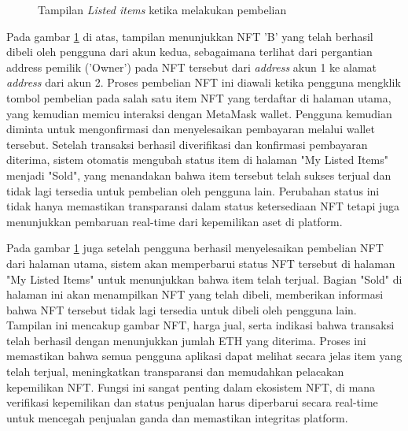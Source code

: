       \begin{figure} [H] \centering
        \caption{Tampilan \emph{Listed items} ketika melakukan pembelian}
        \label{fig:new_listed_item}
        \end{figure}

     Pada gambar \ref{fig:new_listed_item} di atas, tampilan menunjukkan NFT 'B' yang telah berhasil dibeli oleh pengguna dari akun kedua, sebagaimana terlihat dari pergantian address pemilik ('Owner') pada NFT tersebut dari \emph{address} akun 1 ke alamat \emph{address} dari akun 2. Proses pembelian NFT ini diawali ketika pengguna mengklik tombol pembelian pada salah satu item NFT yang terdaftar di halaman utama, yang kemudian memicu interaksi dengan MetaMask wallet. Pengguna kemudian diminta untuk mengonfirmasi dan menyelesaikan pembayaran melalui wallet tersebut. Setelah transaksi berhasil diverifikasi dan konfirmasi pembayaran diterima, sistem otomatis mengubah status item di halaman "My Listed Items" menjadi "Sold", yang menandakan bahwa item tersebut telah sukses terjual dan tidak lagi tersedia untuk pembelian oleh pengguna lain. Perubahan status ini tidak hanya memastikan transparansi dalam status ketersediaan NFT tetapi juga menunjukkan pembaruan real-time dari kepemilikan aset di platform.
      
     Pada gambar \ref{fig:new_listed_item} juga setelah pengguna berhasil menyelesaikan pembelian NFT dari halaman utama, sistem akan memperbarui status NFT tersebut di halaman "My Listed Items" untuk menunjukkan bahwa item telah terjual. Bagian "Sold" di halaman ini akan menampilkan NFT yang telah dibeli, memberikan informasi bahwa NFT tersebut tidak lagi tersedia untuk dibeli oleh pengguna lain. Tampilan ini mencakup gambar NFT, harga jual, serta indikasi bahwa transaksi telah berhasil dengan menunjukkan jumlah ETH yang diterima. Proses ini memastikan bahwa semua pengguna aplikasi dapat melihat secara jelas item yang telah terjual, meningkatkan transparansi dan memudahkan pelacakan kepemilikan NFT. Fungsi ini sangat penting dalam ekosistem NFT, di mana verifikasi kepemilikan dan status penjualan harus diperbarui secara real-time untuk mencegah penjualan ganda dan memastikan integritas platform.
    
